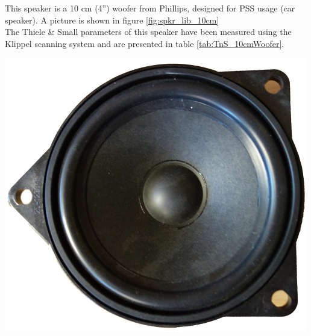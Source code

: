 \documentclass{report}
\begin{document}
\begin{appendices}
\begin{minipage}{0.6\textwidth}
This speaker is a 10 cm (4'') woofer from Phillips, designed for PSS usage (car speaker). A picture is shown in figure \ref{fig:spkr_lib_10cm}\\ 
The Thiele \& Small  parameters of this speaker have been measured using the Klippel scanning system and are presented in table \ref{tab:TnS_10cmWoofer}. 
\end{minipage}
\begin{minipage}{0.4\textwidth}
\begin{center}
	\includegraphics[scale=1]{Appendix/Round_Spkr}
    \captionsetup{hypcap=false}
    \label{fig:spkr_lib_10cm}
\end{center}
\end{minipage}





\end{appendices}
\end{document}
